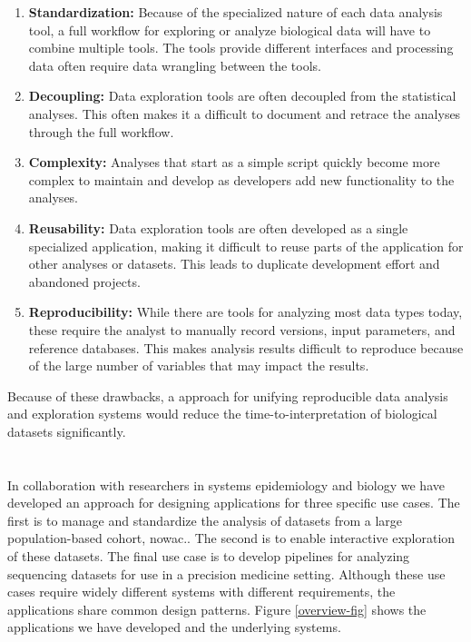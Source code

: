 \begin{enumerate}
    \item \textbf{Standardization:} Because of the specialized nature of each
        data analysis tool, a full workflow for exploring or analyze biological
        data will have to combine multiple tools. The tools provide different
        interfaces and processing data often require data wrangling between the
        tools. 
    \item \textbf{Decoupling:} Data exploration tools are often decoupled from
        the statistical analyses. This often makes it a difficult to document
        and retrace the analyses through the full workflow. 
    \item \textbf{Complexity:} 
        Analyses that start as a simple script quickly become more complex to
        maintain and develop as developers add new functionality to the
        analyses. 
    \item \textbf{Reusability:} Data exploration tools are often
        developed as a single specialized application, making it difficult to
        reuse parts of the application for other analyses or datasets. This
        leads to duplicate development effort and abandoned projects. 
    \item \textbf{Reproducibility:} While there are tools for analyzing most
        data types today, these require the analyst to manually record versions,
        input parameters, and reference databases. This makes analysis results
        difficult to reproduce because of the large number of variables that may
        impact the results. 
\end{enumerate} 

Because of these drawbacks, a approach for unifying reproducible data analysis
and exploration systems would reduce the time-to-interpretation of biological
datasets significantly. 

\section{} 
In collaboration with researchers in systems epidemiology and biology we have
developed an approach for designing applications for three specific use cases.
The first is to manage and standardize the analysis of datasets from a large
population-based cohort, \gls{nowac}.\cite{nowac}. The second is to enable
interactive exploration of these datasets. The final use case is to develop
pipelines for analyzing sequencing datasets for use in a precision medicine
setting.  Although these use cases require widely different systems with
different requirements, the applications share common design patterns. Figure
\ref{overview-fig} shows the applications we have developed and the underlying
systems. 

